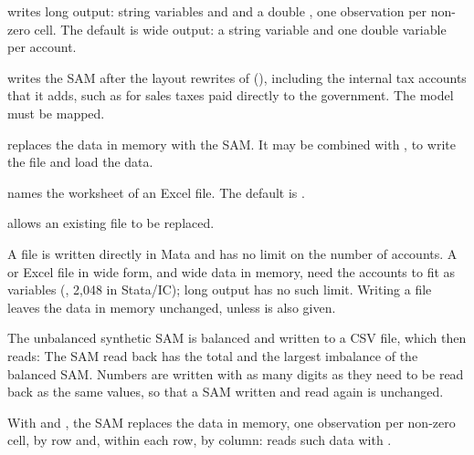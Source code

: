 
\begin{optdesc}
\item[\opt{}{long}] writes long output: string variables  and
 and a double , one observation per non-zero cell. The
default is wide output: a string variable  and one double
variable per account.

\item[\opt{}{mapped}] writes the SAM after the layout rewrites of
 (), including the internal tax accounts
that it adds, such as  for sales taxes paid directly to the
government. The model must be mapped.

\item[\opt{}{clear}] replaces the data in memory with the SAM. It may be
combined with , to write the file and load the data.

\item[\optarg{}{sheet}{string}] names the worksheet of an Excel file. The
default is .

\item[\opt{}{replace}] allows an existing file to be replaced.
\end{optdesc}


A  file is written directly in Mata and has no limit on the number of
accounts. A  or Excel file in wide form, and wide data in memory,
need the accounts to fit as variables (, 2,048 in Stata/IC);
long output has no such limit. Writing a file leaves the data in memory
unchanged, unless  is also given.


The unbalanced synthetic SAM is balanced and written to a CSV file, which
 then reads:
The SAM read back has the total and the largest imbalance of the balanced SAM.
Numbers are written with as many digits as they need to be read back as the
same values, so that a SAM written and read again is unchanged.


With  and , the SAM replaces the data in memory, one
observation per non-zero cell, by row and, within each row, by column:
 reads such data with .

